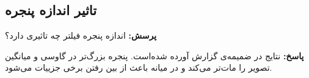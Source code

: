 \documentclass[12pt,a4paper]{article}
\theoremstyle{definition}
\theoremstyle{theorem}
\theoremstyle{definition}
\begin{document}
 
\begin{center}
\end{center} 



\subsection{تاثیر اندازه پنجره}


\textbf{پرسش:}
اندازه پنجره فیلتر چه تاثیری دارد؟

\textbf{پاسخ:}
نتایج در ضمیمه‌ی گزارش آورده شده‌است. پنجره بزرگ‌تر در گاوسی و میانگین تصویر را مات‌تر می‌کند و در میانه باعث از بین رفتن برخی جزییات می‌شود.



\small
\end{document}
